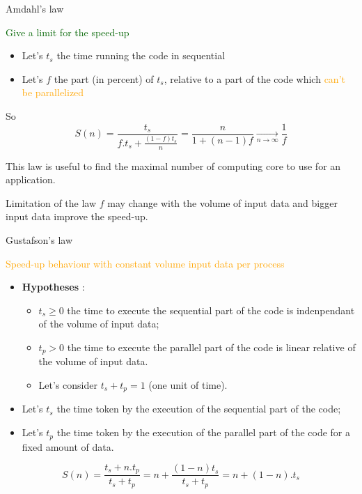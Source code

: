 \documentclass[compress,10pt,aspectratio=169]{beamer}
\begin{document}
\begin{frame}[fragile]{Amdahl's law}
\scriptsize
\begin{center}\textcolor{DarkGreen}{\large Give a limit for the speed-up}\end{center}

\begin{itemize}
\item Let's $t_{s}$ the time running the code in sequential
\item Let's $f$ the part (in percent) of $t_{s}$, relative to a part of the code which \textcolor{orange}{can't be parallelized} 
\end{itemize}

So
\[
    S(n) = \frac{t_{s}}{f.t_{s}+\frac{(1-f)t_{s}}{n}} = \frac{n}{1+(n-1)f} \xrightarrow[n \to \infty]{} \frac{1}{f}
\]

This law is useful to find the maximal number of computing core to use for an application.

\begin{alertblock}{Limitation of the law}
    $f$ may change with the volume of input data and bigger input data improve the speed-up.
\end{alertblock}
\end{frame}

\begin{frame}[fragile]{Gustafson's law}
\scriptsize
\begin{center}{\large \textcolor{orange}{Speed-up behaviour with constant volume input data per process}}\end{center}

\begin{itemize}
\item \textbf{Hypotheses} : 
\begin{itemize}
    \item {\scriptsize $t_{s}\geq 0$ the time to execute the sequential part of the code is indenpendant of the volume of input data;}
    \item {\scriptsize $t_{p} > 0$ the time to execute the parallel part of the code is linear relative of the volume of input data.}
    \item {\scriptsize Let's consider $t_{s}+t_{p} = 1$ (one unit of time)}.
\end{itemize}
\item Let's $t_{s}$ the time token by the execution of the sequential part of the code;
\item Let's $t_{p}$ the time token by the execution of the parallel part of the code for a fixed amount of data.
\end{itemize}

\[
    S(n) = \frac{t_{s}+n.t_{p}}{t_{s}+t_{p}} = n + \frac{(1-n)t_{s}}{t_{s}+t_{p}}
                                             = n + (1-n).t_{s}
\]
\end{frame}
\end{document}
